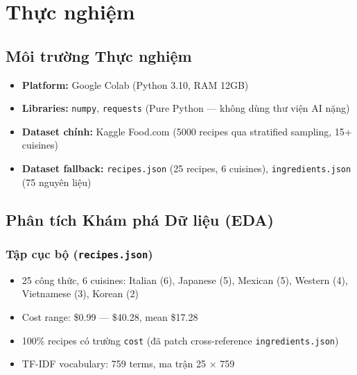 
\section{Thực nghiệm}
\label{sec:experiments}

\subsection{Môi trường Thực nghiệm}
\begin{itemize}
  \item \textbf{Platform:} Google Colab (Python 3.10, RAM 12GB)
  \item \textbf{Libraries:} \texttt{numpy}, \texttt{requests} (Pure Python --- không dùng thư viện AI nặng)
  \item \textbf{Dataset chính:} Kaggle Food.com (5000 recipes qua stratified sampling, 15+ cuisines)
  \item \textbf{Dataset fallback:} \texttt{recipes.json} (25 recipes, 6 cuisines), \texttt{ingredients.json} (75 nguyên liệu)
\end{itemize}

\subsection{Phân tích Khám phá Dữ liệu (EDA)}

\subsubsection{Tập cục bộ (\texttt{recipes.json})}
\begin{itemize}
    \item 25 công thức, 6 cuisines: Italian (6), Japanese (5), Mexican (5), Western (4), Vietnamese (3), Korean (2)
    \item Cost range: \$0.99 --- \$40.28, mean \$17.28
    \item 100\% recipes có trường \texttt{cost} (đã patch cross-reference \texttt{ingredients.json})
    \item TF-IDF vocabulary: 759 terms, ma trận 25 $\times$ 759
\end{itemize}

